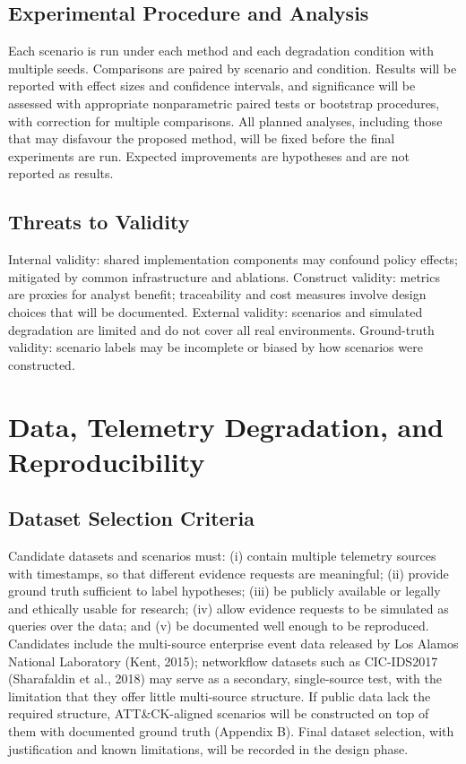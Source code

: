 \documentclass[a4paper,11pt,oneside]{article}
\begin{document}
\subsection{Experimental Procedure and Analysis}
Each scenario is run under each method and each degradation condition with multiple seeds. Comparisons are paired by scenario and condition. Results will be reported with effect sizes and confidence intervals, and significance will be assessed with appropriate nonparametric paired tests or bootstrap procedures, with correction for multiple comparisons. All planned analyses, including those that may disfavour the proposed method, will be
fixed before the final experiments are run. Expected improvements are hypotheses and are not reported as results.
\subsection{Threats to Validity}
Internal validity: shared implementation components may confound policy effects; mitigated by common infrastructure and ablations. Construct validity: metrics are proxies for analyst benefit; traceability and cost measures involve design choices that will be documented. External validity: scenarios and simulated degradation are limited and do not cover all real environments. Ground-truth validity: scenario labels may be incomplete or biased by how scenarios were constructed.
\section{Data, Telemetry Degradation, and Reproducibility}
\subsection{Dataset Selection Criteria}
Candidate datasets and scenarios must: (i) contain multiple telemetry sources with timestamps, so that different evidence requests are meaningful; (ii) provide ground truth sufficient to label hypotheses; (iii) be publicly available or legally and ethically usable for research; (iv) allow evidence requests to be simulated as queries over the data; and (v) be documented well enough to be reproduced. Candidates include the multi-source enterprise event data released by Los Alamos National Laboratory (Kent, 2015); networkflow datasets such as CIC-IDS2017 (Sharafaldin et al., 2018) may serve as a secondary, single-source test, with the limitation that they offer little multi-source structure. If public data lack the required structure, ATT\&CK-aligned scenarios will be constructed on top of them with documented ground truth (Appendix B). Final dataset selection, with justification and known limitations, will be recorded in the design phase.
\end{document}
